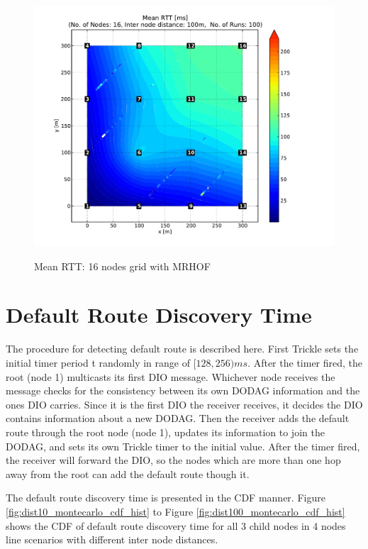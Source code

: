 \begin{figure}[htbp]
{      \includegraphics[scale=0.23]{Pics/results/16/MRHOF/grid/dist100_montecarlo_contour.pdf}}
  \caption{Mean RTT: 16 nodes grid with MRHOF}
 \label{fig:rtt_16_grid_mrhof}
\end{figure} 


\section{Default Route Discovery Time}
\label{default route}

The procedure for detecting default route is described here. First Trickle sets the initial timer period t randomly in range of $[128,256) ms$\@. After the timer fired, the root (node 1) multicasts its first DIO message. Whichever node receives the message checks for the consistency between its own DODAG information and the ones DIO carries. Since it is the first DIO the receiver receives, it decides the DIO contains information about a new DODAG. Then the receiver adds the default route through the root node (node 1)\@, updates its information to join the DODAG, and sets its own Trickle timer to the initial value. After the timer fired, the receiver will forward the DIO, so the nodes which are more than one hop away from the root can add the default route though it.
\newline

The default route discovery time is presented in the CDF manner. Figure \ref{fig:dist10_montecarlo_cdf_hist} to Figure \ref{fig:dist100_montecarlo_cdf_hist} shows the CDF of default route discovery time for all 3 child nodes in 4 nodes line scenarios with different inter node distances.

